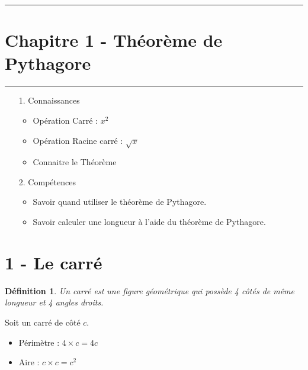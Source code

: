 \documentclass[12pt]{article}
\newcommand{\horrule}[1]{\rule{\linewidth}{#1}} %
\begin{document}

\newtheorem{Definition}{Définition}
\newtheorem{Theorem}{Théorème}
\newtheorem{Proposition}{Propriété}

\renewcommand{\labelitemi}{$\bullet$}
\renewcommand{\labelitemii}{$\circ$}

\setlength{\columnseprule}{1pt}

\horrule{2px}
\section*{Chapitre 1 - Théorème de Pythagore}
\horrule{2px}

\begin{enumerate}
	\item[1.] Connaissances
	      \begin{itemize}
		      \item Opération Carré : $x^2$
		      \item Opération Racine carré : $\sqrt{x}$
		      \item Connaitre le Théorème
	      \end{itemize}
	\item[2.] Compétences
	      \begin{itemize}
		      \item Savoir quand utiliser le théorème de Pythagore.
		      \item Savoir calculer une longueur à l'aide du théorème de Pythagore.
	      \end{itemize}
\end{enumerate}

\section*{1 - Le carré}

\begin{Definition}
	Un carré est une figure géométrique qui possède 4 côtés de même longueur et 4 angles droits.
\end{Definition}

Soit un carré de côté $c$.
\begin{itemize}
	\item Périmètre : $4 \times c = 4c$
	\item Aire : $c \times c = c^2$
\end{itemize}
\end{document}
